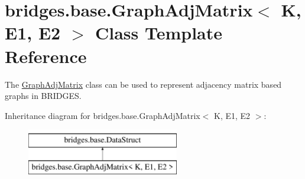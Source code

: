 \hypertarget{classbridges_1_1base_1_1_graph_adj_matrix}{}\section{bridges.\+base.\+Graph\+Adj\+Matrix$<$ K, E1, E2 $>$ Class Template Reference}
\label{classbridges_1_1base_1_1_graph_adj_matrix}


The \mbox{\hyperlink{classbridges_1_1base_1_1_graph_adj_matrix}{Graph\+Adj\+Matrix}} class can be used to represent adjacency matrix based graphs in B\+R\+I\+D\+G\+ES.  


Inheritance diagram for bridges.\+base.\+Graph\+Adj\+Matrix$<$ K, E1, E2 $>$\+:\begin{figure}[H]
\begin{center}
\leavevmode
\includegraphics[height=2.000000cm]{classbridges_1_1base_1_1_graph_adj_matrix}
\end{center}
\end{figure}
